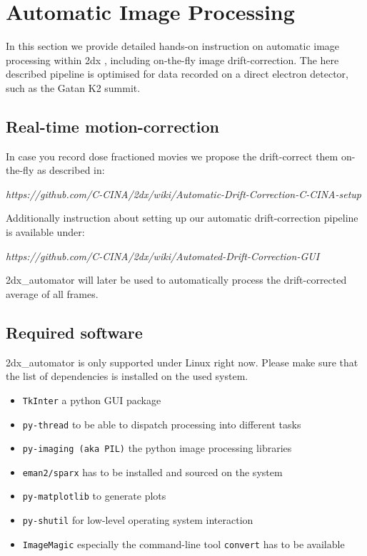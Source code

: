 \section{Automatic Image Processing}

In this section we provide detailed hands-on instruction on automatic image processing within 2dx \cite{scherer20142dx_automator}, including on-the-fly image drift-correction. The here described pipeline is optimised for data recorded on a direct electron detector, such as the Gatan K2 summit. 

\subsection{Real-time motion-correction}

In case you record dose fractioned movies we propose the drift-correct them on-the-fly as described in:

\textit{https://github.com/C-CINA/2dx/wiki/Automatic-Drift-Correction-C-CINA-setup}

Additionally instruction about setting up our automatic drift-correction pipeline is available under:

\textit{https://github.com/C-CINA/2dx/wiki/Automated-Drift-Correction-GUI}

2dx\_automator will later be used to automatically process the drift-corrected average of all frames.

\subsection{Required software}

2dx\_automator is only supported under Linux right now.
Please make sure that the list of dependencies is installed on the used system.

\begin{itemize}
	\item \texttt{TkInter} a python GUI package
	\item \texttt{py-thread} to be able to dispatch processing into different tasks
	\item \texttt{py-imaging (aka PIL)} the python image processing libraries
	\item \texttt{eman2/sparx} has to be installed and sourced on the system
	\item \texttt{py-matplotlib} to generate plots
	\item \texttt{py-shutil} for low-level operating system interaction
	\item \texttt{ImageMagic} especially the command-line tool \texttt{convert} has to be available
\end{itemize}

